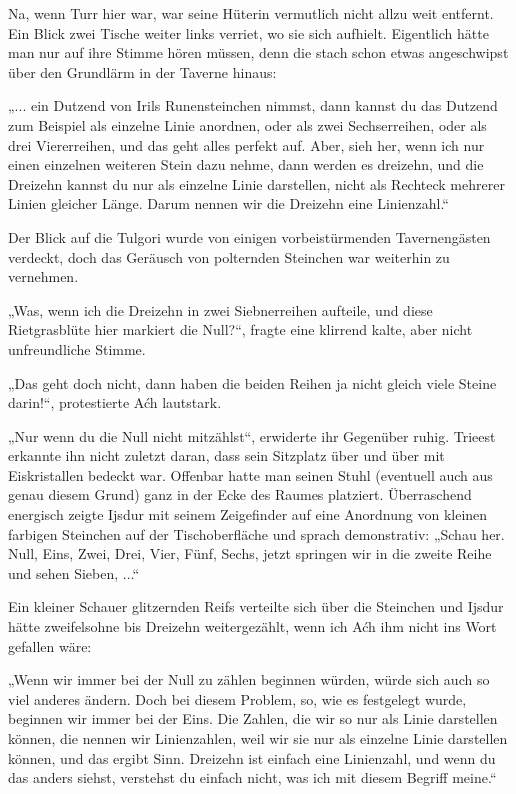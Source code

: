 Na, wenn Turr hier war, war seine Hüterin vermutlich nicht allzu weit entfernt. Ein Blick zwei Tische weiter links verriet, wo sie sich aufhielt. Eigentlich hätte man nur auf ihre Stimme hören müssen, denn die stach schon etwas angeschwipst über den Grundlärm in der Taverne hinaus:

„... ein Dutzend von Irils Runensteinchen nimmst, dann kannst du das Dutzend zum Beispiel als einzelne Linie anordnen, oder als zwei Sechserreihen, oder als drei Viererreihen, und das geht alles perfekt auf. Aber, sieh her, wenn ich nur einen einzelnen weiteren Stein dazu nehme, dann werden es dreizehn, und die Dreizehn kannst du nur als einzelne Linie darstellen, nicht als Rechteck mehrerer Linien gleicher Länge. Darum nennen wir die Dreizehn eine Linienzahl.“

Der Blick auf die Tulgori wurde von einigen vorbeistürmenden Tavernengästen verdeckt, doch das Geräusch von polternden Steinchen war weiterhin zu vernehmen.

„Was, wenn ich die Dreizehn in zwei Siebnerreihen aufteile, und diese Rietgrasblüte hier markiert die Null?“, fragte eine klirrend kalte, aber nicht unfreundliche Stimme.

„Das geht doch nicht, dann haben die beiden Reihen ja nicht gleich viele Steine darin!“, protestierte Aćh lautstark.

„Nur wenn du die Null nicht mitzählst“, erwiderte ihr Gegenüber ruhig. Trieest erkannte ihn nicht zuletzt daran, dass sein Sitzplatz über und über mit Eiskristallen bedeckt war. Offenbar hatte man seinen Stuhl (eventuell auch aus genau diesem Grund) ganz in der Ecke des Raumes platziert. Überraschend energisch zeigte Ijsdur mit seinem Zeigefinder auf eine Anordnung von kleinen farbigen Steinchen auf der Tischoberfläche und sprach demonstrativ: „Schau her. Null, Eins, Zwei, Drei, Vier, Fünf, Sechs, jetzt springen wir in die zweite Reihe und sehen Sieben, ...“

Ein kleiner Schauer glitzernden Reifs verteilte sich über die Steinchen und Ijsdur hätte zweifelsohne bis Dreizehn weitergezählt, wenn ich Aćh ihm nicht ins Wort gefallen wäre:

„Wenn wir immer bei der Null zu zählen beginnen würden, würde sich auch so viel anderes ändern. Doch bei diesem Problem, so, wie es festgelegt wurde, beginnen wir immer bei der Eins. Die Zahlen, die wir so nur als Linie darstellen können, die nennen wir Linienzahlen, weil wir sie nur als einzelne Linie darstellen können, und das ergibt Sinn. Dreizehn ist einfach eine Linienzahl, und wenn du das anders siehst, verstehst du einfach nicht, was ich mit diesem Begriff meine.“

